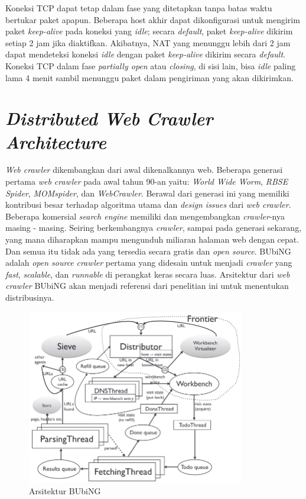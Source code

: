Koneksi TCP dapat tetap dalam fase yang ditetapkan tanpa batas waktu bertukar paket apapun. Beberapa host akhir dapat dikonfigurasi untuk mengirim paket \emph{keep-alive} pada koneksi yang \emph{idle}; secara \emph{default}, paket \emph{keep-alive} dikirim setiap 2 jam jika diaktifkan. Akibatnya, NAT yang menunggu lebih dari 2 jam dapat mendeteksi koneksi \emph{idle} dengan paket \emph{keep-alive} dikirim secara \emph{default}. Koneksi TCP dalam fase \emph{partially open} atau \emph{closing}, di sisi lain, bisa \emph{idle} paling lama 4 menit sambil menunggu paket dalam pengiriman yang akan dikirimkan.

\section{\emph{Distributed Web Crawler Architecture}}

\emph{Web crawler} dikembangkan dari awal dikenalkannya web. Beberapa generasi pertama \emph{web crawler} pada awal tahun 90-an yaitu: \emph{World Wide Worm}, \emph{RBSE Spider}, \emph{MOMspider}, dan \emph{WebCrawler}. Berawal dari generasi ini yang memiliki kontribusi besar terhadap algoritma utama dan \emph{design issues} dari \emph{web crawler}. Beberapa komersial \emph{search engine} memiliki dan mengembangkan \emph{crawler}-nya masing - masing. Seiring berkembangnya \emph{crawler}, sampai pada generasi sekarang, yang mana diharapkan mampu mengunduh miliaran halaman web dengan cepat. Dan semua itu tidak ada yang tersedia secara gratis dan \emph{open source}. BUbiNG adalah \emph{open source} \emph{crawler} pertama yang didesain untuk menjadi \emph{crawler} yang \emph{fast}, \emph{scalable}, dan \emph{runnable} di perangkat keras secara luas. Arsitektur dari \emph{web crawler} BUbiNG akan menjadi referensi dari penelitian ini untuk menentukan distribusinya.

\nocite{boldi2018bubing}

\begin{figure}[H]
  \centering{}
  \includegraphics[width=0.85\textwidth]{gambar/bubing_architecture}
  \caption{Arsitektur BUbiNG}
\end{figure}


